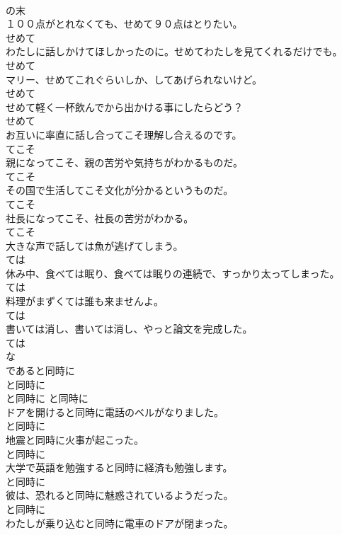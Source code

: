 \documentclass[8pt]{extreport}
\begin{document}
\begin{CJK}{UTF8}{min}
\\	の末
\\	１００点がとれなくても、せめて９０点はとりたい。	
\\	せめて
\\	わたしに話しかけてほしかったのに。せめてわたしを見てくれるだけでも。	
\\	せめて
\\	マリー、せめてこれぐらいしか、してあげられないけど。	
\\	せめて
\\	せめて軽く一杯飲んでから出かける事にしたらどう？	
\\	せめて
\\	お互いに率直に話し合ってこそ理解し合えるのです。	
\\	てこそ
\\	親になってこそ、親の苦労や気持ちがわかるものだ。	
\\	てこそ
\\	その国で生活してこそ文化が分かるというものだ。	
\\	てこそ
\\	社長になってこそ、社長の苦労がわかる。	
\\	てこそ
\\	大きな声で話しては魚が逃げてしまう。	
\\	ては
\\	休み中、食べては眠り、食べては眠りの連続で、すっかり太ってしまった。	
\\	ては
\\	料理がまずくては誰も来ませんよ。	
\\	ては
\\	書いては消し、書いては消し、やっと論文を完成した。	
\\	ては
\\	な
\\	であると同時に	
\\	と同時に	
\\	と同時に	と同時に
\\	ドアを開けると同時に電話のベルがなりました。	
\\	と同時に
\\	地震と同時に火事が起こった。	
\\	と同時に
\\	大学で英語を勉強すると同時に経済も勉強します。	
\\	と同時に
\\	彼は、恐れると同時に魅惑されているようだった。	
\\	と同時に
\\	わたしが乗り込むと同時に電車のドアが閉まった。	

\end{CJK}
\end{document}
